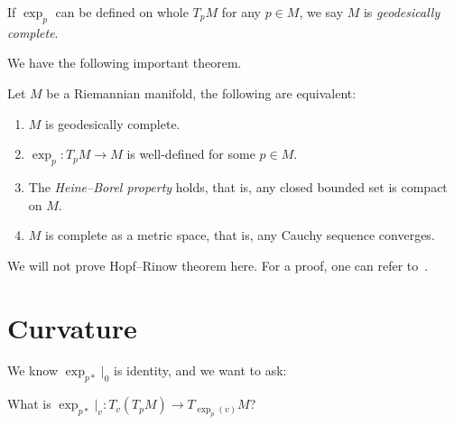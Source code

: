 \begin{defn}\label{geodesically completeness}
    If $\exp_p$ can be defined on whole $T_pM$ for any $p\in M$, we say $M$ is \emph{geodesically complete}.
\end{defn}

We have the following important theorem.

\begin{thm}
    Let $M$ be a Riemannian manifold, the following are equivalent:
    \begin{enumerate}[(1)]
        \item $M$ is geodesically complete.
        \item $\exp_p:T_pM\to M$ is well-defined for some $p\in M$.
        \item The \emph{Heine--Borel property} holds, that is, any closed bounded set is compact on $M$.
        \item $M$ is complete as a metric space, that is, any Cauchy sequence converges.
    \end{enumerate}
\end{thm}

We will not prove Hopf--Rinow theorem here.
For a proof, one can refer to~\cite[Theorem~5.7.1]{Petersen}.

\section{Curvature}\label{sect of curv}

We know $\exp_{p*}|_0$ is identity, and we want to ask:
\begin{ques}
    What is $\exp_{p*}|_v:T_v(T_pM)\to T_{\exp_{p}(v)}M$?
\end{ques}

